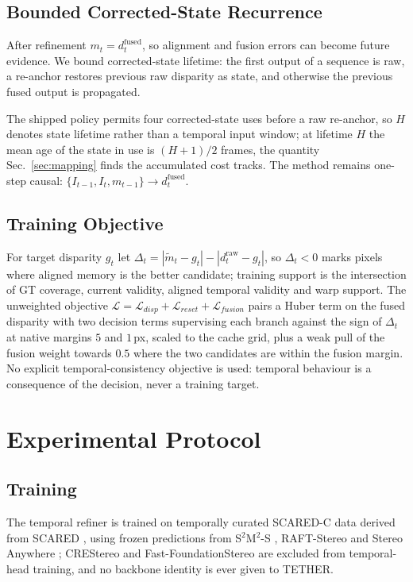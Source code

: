 \documentclass[letterpaper,10pt,conference]{ieeeconf}
\newcommand{\steer}{TETHER}
\newcommand{\raw}{\mathrm{raw}}
\newcommand{\fused}{\mathrm{fused}}
\begin{document}
\subsection{Bounded Corrected-State Recurrence}
\label{sec:recurrence}

After refinement $m_t=d_t^{\fused}$, so alignment and fusion errors can become
future evidence. We bound corrected-state lifetime: the first output of a
sequence is raw, a re-anchor restores previous raw disparity as state, and
otherwise the previous fused output is propagated.

The shipped policy permits four corrected-state uses before a raw re-anchor,
so $H$ denotes state lifetime rather than a temporal input window; at lifetime
$H$ the mean age of the state in use is $(H+1)/2$ frames, the quantity
Sec.~\ref{sec:mapping} finds the accumulated cost tracks. The method remains
one-step causal: $\{I_{t-1},I_t,m_{t-1}\} \rightarrow d_t^{\fused}$.

\subsection{Training Objective}

For target disparity $g_t$ let $\Delta_t=|\widetilde m_t-g_t|-|d_t^{\raw}-g_t|$,
so $\Delta_t<0$ marks pixels where aligned memory is the better candidate;
training support is the intersection of GT coverage, current validity, aligned
temporal validity and warp support. The unweighted objective
$\mathcal{L}=\mathcal{L}_{disp}+\mathcal{L}_{reset}+\mathcal{L}_{fusion}$ pairs
a Huber term on the fused disparity with two decision terms supervising each
branch against the sign of $\Delta_t$ at native margins $5$ and $1$\,px,
scaled to the cache grid, plus a weak pull of the fusion weight towards $0.5$
where the two candidates are within the fusion margin. No explicit
temporal-consistency objective is used: temporal behaviour is a consequence of
the decision, never a training target.

\section{Experimental Protocol}
\label{sec:experimental}

\subsection{Training}

The temporal refiner is trained on temporally curated SCARED-C data derived
from SCARED \cite{allan2021scared}, using frozen predictions from
S$^2$M$^2$-S \cite{min2025s2m2}, RAFT-Stereo \cite{lipson2021raftstereo} and
Stereo Anywhere \cite{bartolomei2025stereoanywhere}; CREStereo
\cite{li2022crestereo} and Fast-FoundationStereo
\cite{wen2026fastfoundationstereo} are excluded from temporal-head training,
and no backbone identity is ever given to \steer.
\end{document}
